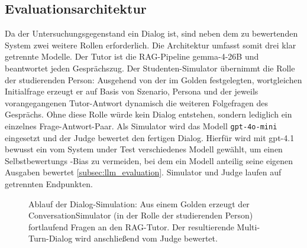 \subsection{Evaluationsarchitektur}
\label{subsec:architektur}

Da der Untersuchungsgegenstand ein Dialog ist, sind neben dem zu bewertenden System zwei
weitere Rollen erforderlich. Die Architektur umfasst somit drei klar getrennte Modelle.
Der Tutor ist die RAG-Pipeline {gemma-4-26B} und beantwortet jeden
Gesprächszug. Der Studenten-Simulator übernimmt die Rolle der studierenden Person: Ausgehend von der
im Golden festgelegten, wortgleichen Initialfrage erzeugt er auf Basis von Szenario,
Persona und der jeweils vorangegangenen Tutor-Antwort dynamisch die weiteren
Folgefragen des Gesprächs. Ohne diese Rolle würde kein Dialog entstehen, sondern
lediglich ein einzelnes Frage-Antwort-Paar. Als Simulator wird das Modell
\texttt{gpt-4o-mini} eingesetzt und der Judge bewertet den fertigen Dialog. Hierfür wird mit
gpt-4.1 bewusst ein vom System under Test verschiedenes Modell gewählt, um
einen Selbstbewertungs -Bias zu vermeiden, bei dem ein Modell anteilig seine eigenen
Ausgaben bewertet \ref{subsec:llm_evaluation}. Simulator und Judge laufen auf getrennten Endpunkten.
\begin{figure}[htbp]
  \centering
  \caption{Ablauf der Dialog-Simulation: Aus einem Golden erzeugt der
  ConversationSimulator (in der Rolle der studierenden Person) fortlaufend
  Fragen an den RAG-Tutor. Der resultierende Multi-Turn-Dialog wird anschlie{\ss}end
  vom Judge bewertet.}
  \label{fig:simulationsablauf}
\end{figure}
